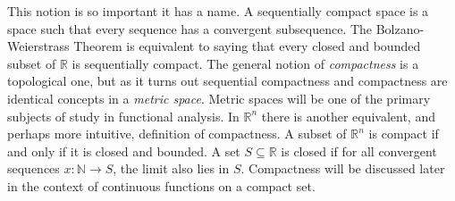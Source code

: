             This notion is so important it has a name.
            A sequentially compact space is a space such that
            every sequence has a convergent subsequence. The
            Bolzano-Weierstrass Theorem is equivalent
            to saying that every closed and bounded subset
            of $\mathbb{R}$ is sequentially
            compact. The general notion of \textit{compactness}
            is a topological one, but as it turns out
            sequential compactness and compactness are
            identical concepts in a \textit{metric space}.
            Metric spaces will be one of the primary
            subjects of study in functional analysis.
            In $\mathbb{R}^{n}$ there is another equivalent,
            and perhaps more intuitive,
            definition of compactness. A subset of
            $\mathbb{R}^{n}$ is compact if and only if it
            is closed and bounded. A set
            $S\subseteq\mathbb{R}$ is closed if for
            all convergent sequences
            $x:\mathbb{N}\rightarrow{S}$,
            the limit also lies in $S$.
            Compactness will be discussed later in the
            context of continuous functions on a compact set.
